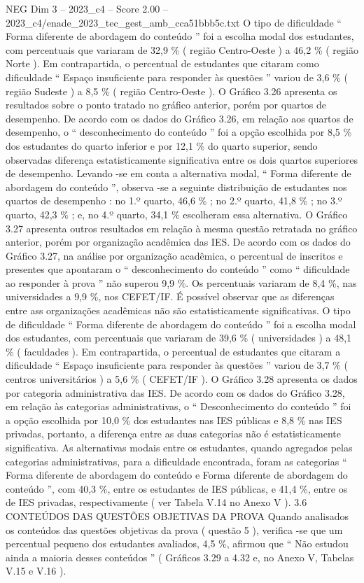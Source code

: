 \begin{textsample}{NEG Dim 3 – 2023\_c4 – Score 2.00 – 2023\_c4/enade\_2023\_tec\_gest\_amb\_cca51bbb5c.txt}
O tipo de dificuldade “ Forma diferente de abordagem do conteúdo ” foi a escolha modal dos estudantes, com percentuais que variaram de 32,9 \% ( região Centro-Oeste ) a 46,2 \% ( região Norte ).
Em contrapartida, o percentual de estudantes que citaram como dificuldade “ Espaço insuficiente para responder às questões ” variou de 3,6 \% ( região Sudeste ) a 8,5 \% ( região Centro-Oeste ).
O Gráfico 3.26 apresenta os resultados sobre o ponto tratado no gráfico anterior, porém por quartos de desempenho.
De acordo com os dados do Gráfico 3.26, em relação aos quartos de desempenho, o “ desconhecimento do conteúdo ” foi a opção escolhida por 8,5 \% dos estudantes do quarto inferior e por 12,1 \% do quarto superior, sendo observadas diferença estatisticamente significativa entre os dois quartos superiores de desempenho.
Levando -se em conta a alternativa modal, “ Forma diferente de abordagem do conteúdo ”, observa -se a seguinte distribuição de estudantes nos quartos de desempenho : no 1.º quarto, 46,6 \% ; no 2.º quarto, 41,8 \% ; no 3.º quarto, 42,3 \% ; e, no 4.º quarto, 34,1 \% escolheram essa alternativa.
O Gráfico 3.27 apresenta outros resultados em relação à mesma questão retratada no gráfico anterior, porém por organização acadêmica das IES.
De acordo com os dados do Gráfico 3.27, na análise por organização acadêmica, o percentual de inscritos e presentes que apontaram o “ desconhecimento do conteúdo ” como “ dificuldade ao responder à prova ” não superou 9,9 \%.
Os percentuais variaram de 8,4 \%, nas universidades a 9,9 \%, nos CEFET/IF.
É possível observar que as diferenças entre ass organizações acadêmicas não são estatisticamente significativas.
O tipo de dificuldade “ Forma diferente de abordagem do conteúdo ” foi a escolha modal dos estudantes, com percentuais que variaram de 39,6 \% ( universidades ) a 48,1 \% ( faculdades ).
Em contrapartida, o percentual de estudantes que citaram a dificuldade “ Espaço insuficiente para responder às questões ” variou de 3,7 \% ( centros universitários ) a 5,6 \% ( CEFET/IF ).
O Gráfico 3.28 apresenta os dados por categoria administrativa das IES.
De acordo com os dados do Gráfico 3.28, em relação às categorias administrativas, o “ Desconhecimento do conteúdo ” foi a opção escolhida por 10,0 \% dos estudantes nas IES públicas e 8,8 \% nas IES privadas, portanto, a diferença entre as duas categorias não é estatisticamente significativa.
As alternativas modais entre os estudantes, quando agregados pelas categorias administrativas, para a dificuldade encontrada, foram as categorias “ Forma diferente de abordagem do conteúdo e Forma diferente de abordagem do conteúdo ”, com 40,3 \%, entre os estudantes de IES públicas, e 41,4 \%, entre os de IES privadas, respectivamente ( ver Tabela V.14 no Anexo V ). 3.6 CONTEÚDOS DAS QUESTÕES OBJETIVAS DA PROVA Quando analisados os conteúdos das questões objetivas da prova ( questão 5 ), verifica -se que um percentual pequeno dos estudantes avaliados, 4,5 \%, afirmou que “ Não estudou ainda a maioria desses conteúdos ” ( Gráficos 3.29 a 4.32 e, no Anexo V, Tabelas V.15 e V.16 ).

\end{textsample}
